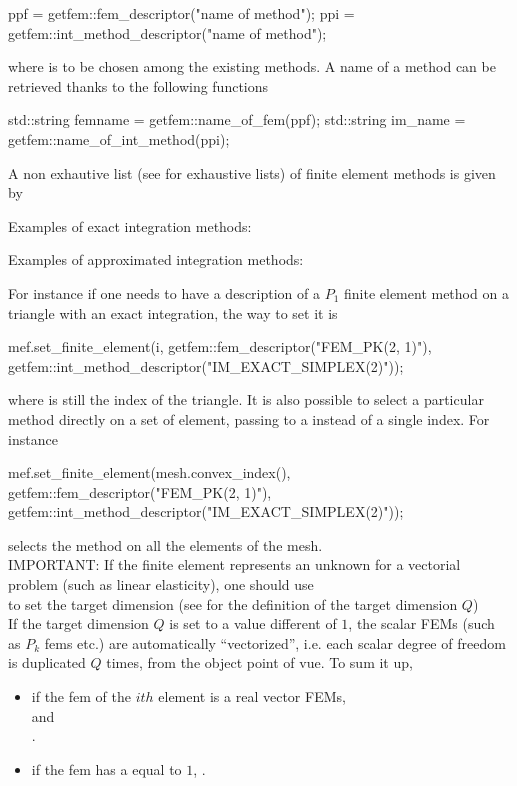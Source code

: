 \documentclass[11pt,a4paper]{article}
\begin{document}
\begin{cppcode}
  ppf = getfem::fem\_descriptor("name of method");
  ppi = getfem::int\_method\_descriptor("name of method");
\end{cppcode}
where  is to be chosen among the existing methods.
A name of a method can be retrieved thanks to the following functions\\[0.5cm]
\begin{cppcode}
  std::string femname = getfem::name\_of\_fem(ppf); 
  std::string im\_name = getfem::name\_of\_int\_method(ppi);
\end{cppcode}
A non exhautive list (see \cite{FEMLIST} for exhaustive lists) of finite element methods is given by

Examples of exact integration methods:

Examples of approximated integration methods:


For instance if one needs to have a description of a $P_1$ finite element method on a triangle with an exact integration, the way to set it is
\begin{cppcode}
 mef.set\_finite\_element(i, getfem::fem\_descriptor("FEM\_PK(2, 1)"),
                        getfem::int\_method\_descriptor("IM\_EXACT\_SIMPLEX(2)"));
\end{cppcode}
where  is still the index of the triangle. It is also possible to select a particular method directly on a set of element, passing to  a  instead of a single index. For instance
\begin{cppcode}
 mef.set\_finite\_element(mesh.convex\_index(), getfem::fem\_descriptor("FEM\_PK(2, 1)"),
                        getfem::int\_method\_descriptor("IM\_EXACT\_SIMPLEX(2)"));
\end{cppcode}
selects the method on all the elements of the mesh.\\[0.5cm]
IMPORTANT: If the finite element represents an unknown for a vectorial problem (such as linear elasticity), one should use
\\[0.5cm]
to set the target dimension (see
\cite{BASCOMP} for the definition of the target dimension $Q$)\\[0.5cm]
If the target dimension $Q$ is set to a value different of $1$, the
scalar FEMs (such as $P_k$ fems etc.) are automatically
``vectorized'', i.e. each scalar degree of freedom is duplicated $Q$
times, from the  object point of vue. To sum it up,
\begin{itemize}
\item if the fem of the $ith$ element is a real vector FEMs,  \\ and\\ .
\item if the fem has a  equal to $1$, .
\end{itemize}
\end{document}
